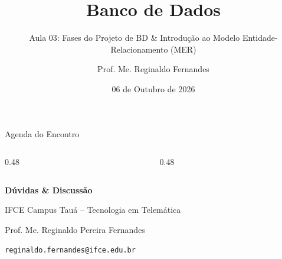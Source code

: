 \documentclass[aspectratio=169,utf8,t]{beamer}
\author{Prof. Me. Reginaldo Fernandes}
\institute{Instituto Federal do Ceará -- Campus Tauá \\ Tecnologia em Telemática}
\title{Banco de Dados}
\subtitle{Aula 03: Fases do Projeto de BD \& Introdução ao Modelo Entidade-Relacionamento (MER)}
\date{06 de Outubro de 2026}
\begin{document}
\frame[plain]{\titlepage}

\begin{frame}{Agenda do Encontro}
  \vspace{0.2cm}
  \begin{columns}[t]
    \begin{column}{0.48\textwidth}
      \tableofcontents[sections={1-4}]
    \end{column}
    \begin{column}{0.48\textwidth}
      \tableofcontents[sections={5-8}]
    \end{column}
  \end{columns}
\end{frame}










\begin{frame}[plain]
  \vspace{2cm}
  \centering
  {\Huge \textbf{Dúvidas \& Discussão}}\par
  \vspace{0.8cm}
  {\large IFCE Campus Tauá -- Tecnologia em Telemática}\par
  \vspace{0.3cm}
  {\small Prof. Me. Reginaldo Pereira Fernandes}\par
  {\scriptsize \texttt{reginaldo.fernandes@ifce.edu.br}}
\end{frame}
\end{document}
